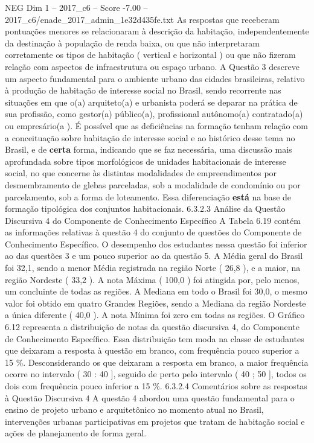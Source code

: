 \begin{textsample}{NEG Dim 1 – 2017\_c6 – Score -7.00 – 2017\_c6/enade\_2017\_admin\_1e32d435fe.txt}
As respostas que receberam pontuações menores se relacionaram à descrição da habitação, independentemente da destinação à população de renda baixa, ou que não interpretaram corretamente os tipos de habitação ( vertical e horizontal ) ou que não fizeram relação com aspectos de infraestrutura ou espaço urbano.
A Questão 3 descreve um aspecto fundamental para o ambiente urbano das cidades brasileiras, relativo à produção de habitação de interesse social no Brasil, sendo recorrente nas situações em que o(a) arquiteto(a) e urbanista poderá se deparar na prática de sua profissão, como gestor(a) público(a), profissional autônomo(a) contratado(a) ou empresário(a ).
É possível que as deficiências na formação tenham relação com a conceituação sobre habitação de interesse social e ao histórico desse tema no Brasil, e de \textbf{certa} forma, indicando que se faz necessária, uma discussão mais aprofundada sobre tipos morfológicos de unidades habitacionais de interesse social, no que concerne às distintas modalidades de empreendimentos por desmembramento de glebas parceladas, sob a modalidade de condomínio ou por parcelamento, sob a forma de loteamento.
Essa diferenciação \textbf{está} na base de formação tipológica dos conjuntos habitacionais. 6.3.2.3 Análise da Questão Discursiva 4 do Componente de Conhecimento Específico A Tabela 6.19 contém as informações relativas à questão 4 do conjunto de questões do Componente de Conhecimento Específico.
O desempenho dos estudantes nessa questão foi inferior ao das questões 3 e um pouco superior ao da questão 5.
A Média geral do Brasil foi 32,1, sendo a menor Média registrada na região Norte ( 26,8 ), e a maior, na região Nordeste ( 33,2 ).
A nota Máxima ( 100,0 ) foi atingida por, pelo menos, um concluinte de todas as regiões.
A Mediana em todo o Brasil foi 30,0, o mesmo valor foi obtido em quatro Grandes Regiões, sendo a Mediana da região Nordeste a única diferente ( 40,0 ).
A nota Mínima foi zero em todas as regiões.
O Gráfico 6.12 representa a distribuição de notas da questão discursiva 4, do Componente de Conhecimento Específico.
Essa distribuição tem moda na classe de estudantes que deixaram a resposta à questão em branco, com frequência pouco superior a 15 \%.
Desconsiderando os que deixaram a resposta em branco, a maior frequência ocorre no intervalo ( 30 : 40 ], seguido de perto pelo intervalo ( 40 ; 50 ], todos os dois com frequência pouco inferior a 15 \%. 6.3.2.4 Comentários sobre as respostas à Questão Discursiva 4 A questão 4 abordou uma questão fundamental para o ensino de projeto urbano e arquitetônico no momento atual no Brasil, intervenções urbanas participativas em projetos que tratam de habitação social e ações de planejamento de forma geral.

\end{textsample}
